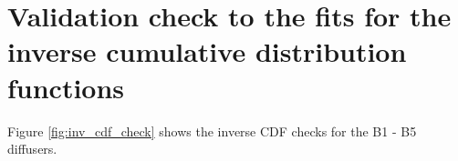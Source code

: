 \begin{figure}
        
    \end{figure}


\section{Validation check to the fits for the inverse cumulative distribution functions}
Figure \ref{fig:inv_cdf_check} shows the inverse CDF checks for the B1 - B5 diffusers.

